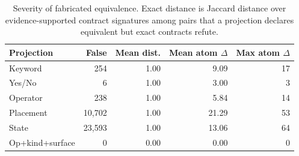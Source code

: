 \begin{table}[t]
\centering
\caption{Severity of fabricated equivalence. Exact distance is Jaccard distance over evidence-supported contract signatures among pairs that a projection declares equivalent but exact contracts refute.}
\label{tab:false-severity}
\scriptsize
\begin{tabular}{lrrrr}
\toprule
Projection & False & Mean dist. & Mean atom $\Delta$ & Max atom $\Delta$ \\
\midrule
Keyword & 254 & 1.00 & 9.09 & 17 \\
Yes/No & 6 & 1.00 & 3.00 & 3 \\
Operator & 238 & 1.00 & 5.84 & 14 \\
Placement & 10,702 & 1.00 & 21.29 & 53 \\
State & 23,593 & 1.00 & 13.06 & 64 \\
Op+kind+surface & 0 & 0.00 & 0.00 & 0 \\
\bottomrule
\end{tabular}
\end{table}
